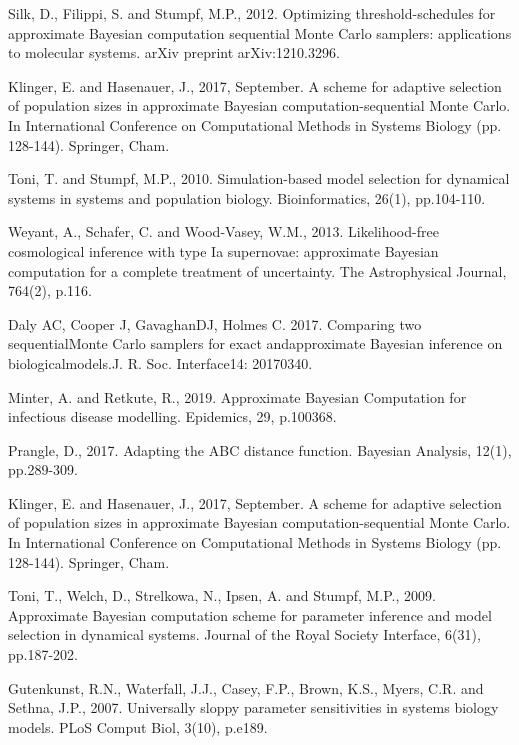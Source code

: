 \documentclass[12pt,a4paper]{report}
\begin{document}
\begin{thebibliography}{100}
     Silk, D., Filippi, S. and Stumpf, M.P., 2012. Optimizing threshold-schedules for approximate Bayesian computation sequential Monte Carlo samplers: applications to molecular systems. arXiv preprint arXiv:1210.3296.

     Klinger, E. and Hasenauer, J., 2017, September. A scheme for adaptive selection of population sizes in approximate Bayesian computation-sequential Monte Carlo. In International Conference on Computational Methods in Systems Biology (pp. 128-144). Springer, Cham.

     Toni, T. and Stumpf, M.P., 2010. Simulation-based model selection for dynamical systems in systems and population biology. Bioinformatics, 26(1), pp.104-110.

     Weyant, A., Schafer, C. and Wood-Vasey, W.M., 2013. Likelihood-free cosmological inference with type Ia supernovae: approximate Bayesian computation for a complete treatment of uncertainty. The Astrophysical Journal, 764(2), p.116.

     Daly AC, Cooper J, GavaghanDJ, Holmes C. 2017. Comparing two sequentialMonte Carlo samplers for exact andapproximate Bayesian inference on biologicalmodels.J. R. Soc. Interface14: 20170340.

     Minter, A. and Retkute, R., 2019. Approximate Bayesian Computation for infectious disease modelling. Epidemics, 29, p.100368.

     Prangle, D., 2017. Adapting the ABC distance function. Bayesian Analysis, 12(1), pp.289-309.

     Klinger, E. and Hasenauer, J., 2017, September. A scheme for adaptive selection of population sizes in approximate Bayesian computation-sequential Monte Carlo. In International Conference on Computational Methods in Systems Biology (pp. 128-144). Springer, Cham.

     Toni, T., Welch, D., Strelkowa, N., Ipsen, A. and Stumpf, M.P., 2009. Approximate Bayesian computation scheme for parameter inference and model selection in dynamical systems. Journal of the Royal Society Interface, 6(31), pp.187-202.

     Gutenkunst, R.N., Waterfall, J.J., Casey, F.P., Brown, K.S., Myers, C.R. and Sethna, J.P., 2007. Universally sloppy parameter sensitivities in systems biology models. PLoS Comput Biol, 3(10), p.e189.

\end{thebibliography}
\end{document}
